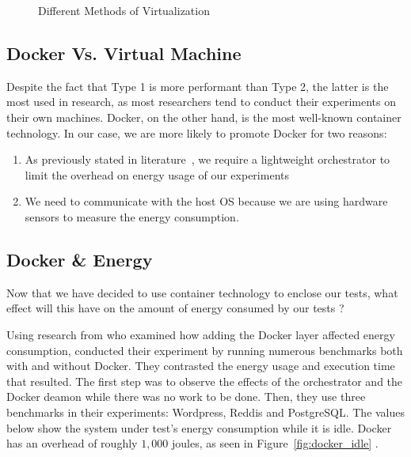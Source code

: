 \begin{figure}
    \caption{Different Methods of Virtualization}\label{environement:virtualization_technique}
\end{figure}


\subsection{Docker Vs. Virtual Machine}
Despite the fact that Type 1 is more performant than Type 2, the latter is the most used in research, as most researchers tend to conduct their experiments on their own machines. Docker, on the other hand, is the most well-known container technology. In our case, we are more likely to promote Docker for two reasons:
\begin{enumerate}
    \item As previously stated in literature~\cite{van2016power,morabito_power_2015}, we require a lightweight orchestrator to limit the overhead on energy usage of our experiments
    \item We need to communicate with the host OS because we are using hardware sensors to measure the energy consumption.
\end{enumerate}



\subsection{Docker \& Energy}
Now that we have decided to use container technology to enclose our tests, what effect will this have on the amount of energy consumed by our tests ?


Using research from \cite{eddie_antonio_santos_how} who examined how adding the Docker layer affected energy consumption, \citeauthor{eddie_antonio_santos_how} conducted their experiment by running numerous benchmarks both with and without Docker. They contrasted the energy usage and execution time that resulted.
The first step was to observe the effects of the orchestrator and the Docker deamon while there was no work to be done.
Then, they use three benchmarks in their experiments: Wordpress, Reddis and PostgreSQL.
The values below show the system under test's energy consumption while it is idle.
Docker has an overhead of roughly $1,000$  joules, as seen in Figure~\ref{fig:docker_idle} .


